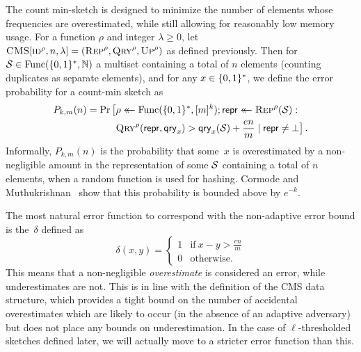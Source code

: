 %
The count min-sketch is designed to minimize the number of elements whose
frequencies are overestimated, while still allowing for reasonably low memory
usage. For a function $\rho$ and integer $\lambda\ge0$, let
$\textnormal{\textsc{CMS}}[\textnormal{\textsc{id}}^\rho,n,\lambda] = (\textnormal{\textsc{Rep}}^\rho,\textnormal{\textsc{Qry}}^\rho,\textnormal{\textsc{Up}}^\rho)$ as defined
previously. Then for $\mathcal{S} \in \mathrm{Func}(\{0,1\}^*,\mathbb{N})$  a multiset containing a total
of $n$ elements (counting duplicates as separate elements), and for any
$x \in \{0,1\}^*$, we define the error probability for a count-min sketch as
\begin{equation}\label{eq:bf-fp}
  \begin{aligned}
    P_{k,m}(n) =
      \Pr\big[&\rho \mathrel{\leftarrow\mkern-14mu\leftarrow} \mathrm{Func}(\{0,1\}^*,[m]^k);
              \mathsf{repr} \mathrel{\leftarrow\mkern-14mu\leftarrow} \textnormal{\textsc{Rep}}^\rho(\mathcal{S}): \\
              &\textnormal{\textsc{Qry}}^\rho(\mathsf{repr}, \mathsf{qry}_x) > \mathsf{qry}_x(\mathcal{S})+\frac{en}{m} \mid \mathsf{repr} \ne \bot
      \big] \,.
  \end{aligned}
\end{equation}
%
%
Informally, $P_{k,m}(n)$ is the probability that some~$x$ is overestimated by a
non-negligible amount in the representation of some $\mathcal{S}$ containing a total
of $n$ elements, when a random function is used for hashing. Cormode and
Muthukrishnan~\cite{cormode2005improved} show that this probability is bounded
above by $e^{-k}$.

%
The most natural error function to correspond with the non-adaptive error bound
is the~$\delta$ defined as
\begin{equation}
  \delta(x, y) =
  \begin{cases}
    1 & \text{if}\ x - y > \frac{en}{m} \\
    0 & \text{otherwise.}
  \end{cases}
\end{equation}
%
%
This means that a non-negligible \emph{overestimate} is considered an error,
while underestimates are not. This is in line with the definition of the CMS
data structure, which provides a tight bound on the number of accidental
overestimates which are likely to occur (in the absence of an adaptive
adversary) but does not place any bounds on underestimation. In the case of
$\ell$-thresholded sketches defined later, we will actually move to a stricter
error function than this.

